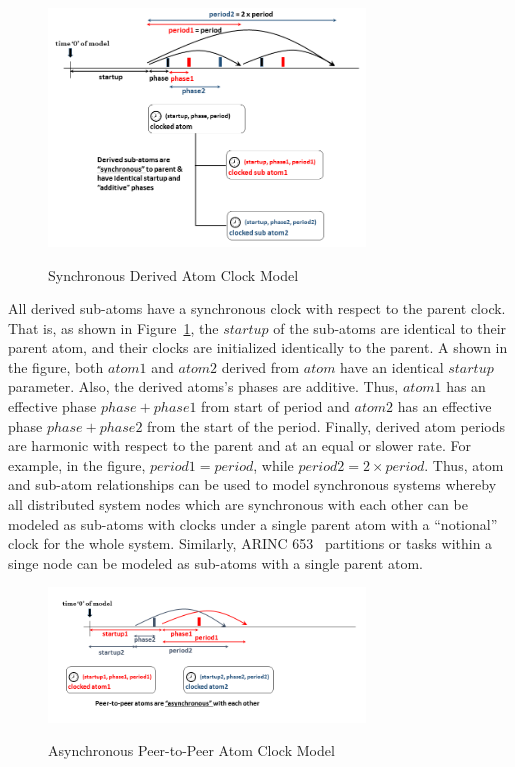 \begin{figure}[h!]
\centering
\caption{Synchronous Derived Atom Clock Model}
 \includegraphics[width=0.75\textwidth]{figures/sync_clocked_atom.png}
\label{fig:sync_clock_atom_model}
\end{figure}

All derived sub-atoms have a synchronous clock with respect to the parent clock. That is, as shown in Figure~\ref{fig:sync_clock_atom_model}, the $startup$ of the sub-atoms are identical to their parent atom, and their clocks are initialized identically to the parent. A shown in the figure, both $atom1$ and $atom2$ derived from $atom$ have an identical $startup$ parameter. Also, the derived atoms's phases are additive. Thus, $atom1$ has an effective phase $phase+phase1$ from start of period and $atom2$ has an effective phase $phase+phase2$ from the start of the period. Finally, derived atom periods are harmonic with respect to the parent and at an equal or slower rate. For example, in the figure, $period1 = period$, while $period2 = 2 \times period$. Thus, atom and sub-atom relationships can be used to model synchronous systems whereby all distributed system nodes which are synchronous with each other can be modeled as sub-atoms with clocks under a single parent atom with a ``notional'' clock for the whole system. Similarly, ARINC 653~\cite{arinc653} partitions or tasks within a singe node can be modeled as sub-atoms with a single parent atom.

\begin{figure}[h!]
\centering
\caption{Asynchronous Peer-to-Peer Atom Clock Model}
 \includegraphics[width=0.75\textwidth]{figures/async_clocked_atom.png}
\label{fig:async_clock_atom_model}
\end{figure}

